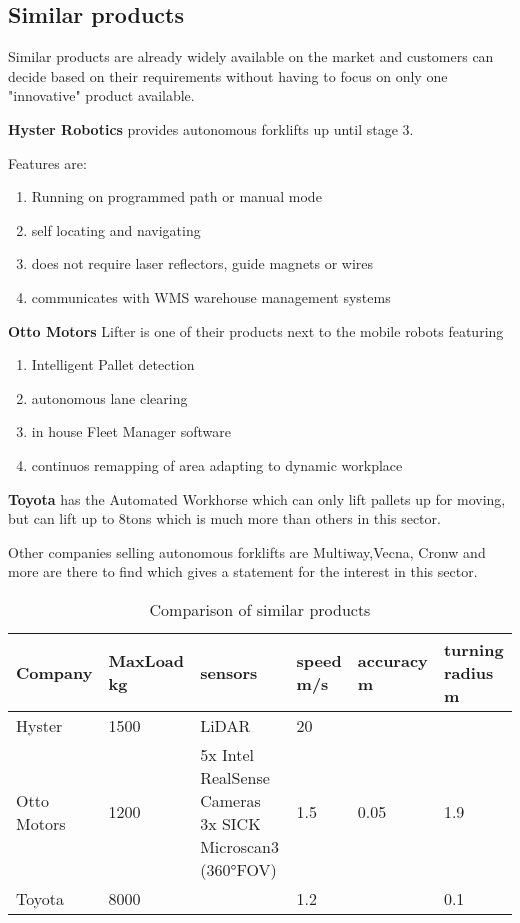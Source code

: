 \documentclass[../report.tex]{subfiles}
\begin{document}
\subsection{Similar products}
Similar products are already widely available on the market and customers can decide based on their requirements
without having to focus on only one "innovative" product available.

\textbf{Hyster Robotics} provides autonomous forklifts up until stage 3.

Features are:
\begin{enumerate}
    \item Running on programmed path or manual mode
    \item self locating and navigating
    \item does not require laser reflectors, guide magnets or wires
    \item communicates with WMS warehouse management systems 
\end{enumerate}

\textbf{Otto Motors} Lifter is one of their products next to the mobile robots featuring
\begin{enumerate}
    \item Intelligent Pallet detection
    \item autonomous lane clearing
    \item in house Fleet Manager software
    \item continuos remapping of area adapting to dynamic workplace
\end{enumerate}

\textbf{Toyota} has the Automated Workhorse which can only lift pallets up for moving, but 
can lift up to 8tons which is much more than others in this sector.

Other companies selling autonomous forklifts are Multiway,Vecna, Cronw and more are there to find 
which gives a statement for the interest in this sector. 
\begin{table}[H]
    \begin{tabularx}{\linewidth}{| L || L | L | L | L | L | } 
        \hline
        Company& MaxLoad kg & sensors & speed m/s & accuracy m & turning radius m \\ 
        \hline
        \hline
        Hyster & 1500 & LiDAR& 20 & & \\ 
        \hline
        Otto Motors & 1200 & 5x Intel RealSense Cameras 3x SICK Microscan3 (360°FOV)& 1.5 & 0.05 & 1.9\\ 
        \hline
        Toyota & 8000 & & 1.2 & &0.1\\
        \hline
      \end{tabularx}
      \caption{Comparison of similar products}
\end{table}
\end{document}
